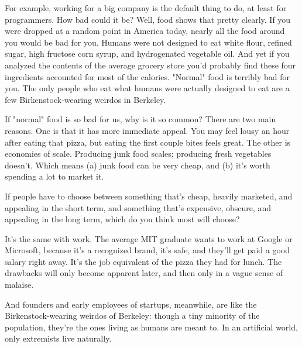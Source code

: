 For example, working for a
                    big company is the default thing to do, at least for
                    programmers. How bad could it be? Well, food shows that
                    pretty clearly. If you were dropped at a random point in
                    America today, nearly all the food around you would be bad
                    for you. Humans were not designed to eat white flour,
                    refined sugar, high fructose corn syrup, and hydrogenated
                    vegetable oil. And yet if you analyzed the contents of the
                    average grocery store you'd probably find these four
                    ingredients accounted for most of the calories. "Normal"
                    food is terribly bad for you. The only people who eat what
                    humans were actually designed to eat are a few
                    Birkenstock-wearing weirdos in Berkeley.

If
                    "normal" food is so bad for us, why is it so common? There
                    are two main reasons. One is that it has more immediate
                    appeal. You may feel lousy an hour after eating that pizza,
                    but eating the first couple bites feels great. The other is
                    economies of scale. Producing junk food scales; producing
                    fresh vegetables doesn't. Which means (a) junk food can be
                    very cheap, and (b) it's worth spending a lot to market
                    it.

If people have to choose between something
                    that's cheap, heavily marketed, and appealing in the short
                    term, and something that's expensive, obscure, and appealing
                    in the long term, which do you think most will choose?

It's
                    the same with work. The average MIT graduate wants to work
                    at Google or Microsoft, because it's a recognized brand,
                    it's safe, and they'll get paid a good salary right away.
                    It's the job equivalent of the pizza they had for lunch. The
                    drawbacks will only become apparent later, and then only in
                    a vague sense of malaise.

And founders and early
                    employees of startups, meanwhile, are like the
                    Birkenstock-wearing weirdos of Berkeley: though a tiny
                    minority of the population, they're the ones living as
                    humans are meant to. In an artificial world, only extremists
                    live naturally.


